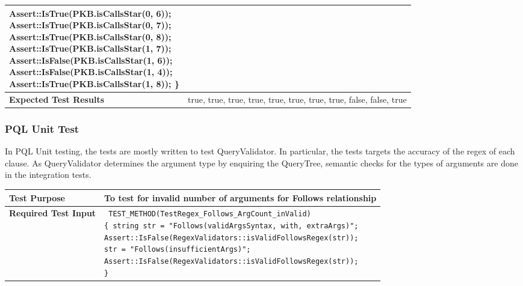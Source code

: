 \documentclass[12pt]{article}
\begin{document}
{{{{{{{{{{{{{\begin{longtable}{|L{5cm} | L{12cm}| }
{	\hspace{9mm} Assert::IsTrue(PKB.isCallsStar(0, 6)); \newline
	\hspace{9mm} Assert::IsTrue(PKB.isCallsStar(0, 7)); \newline
	\hspace{9mm} Assert::IsTrue(PKB.isCallsStar(0, 8)); \newline
	\hspace{9mm} Assert::IsTrue(PKB.isCallsStar(1, 7)); \newline
	\hspace{9mm} Assert::IsFalse(PKB.isCallsStar(1, 6)); \newline
	\hspace{9mm} Assert::IsFalse(PKB.isCallsStar(1, 4)); \newline
	\hspace{9mm} Assert::IsTrue(PKB.isCallsStar(1, 8)); \} }

 \\\hline
   \textbf{ Expected Test Results} &

true, true, true, true, true, true, true, true, false, false, true
 \\\hline
\end{longtable}

\subsubsection{PQL Unit Test}
In PQL Unit testing, the tests are mostly written to test QueryValidator. In particular, the tests targets the accuracy of the regex of each clause. As QueryValidator determines the argument type by enquiring the QueryTree, semantic checks for the types of arguments are done in the integration tests.

\begin{longtable}{|L{5cm} | L{12.5cm}| }
\hline
\textbf{Test Purpose} &
To test for invalid number of arguments for Follows relationship
\\\hline
\textbf{Required Test Input}
 &
 \texttt{
 \noindent TEST\_METHOD(TestRegex\_Follows\_ArgCount\_inValid)
\newline \vspace{2mm}
\footnotesize \{ \hspace{4mm}  string str = "Follows(validArgsSyntax, with, extraArgs)"; \newline \vspace{2mm}
 \hspace{9mm} Assert::IsFalse(RegexValidators::isValidFollowsRegex(str)); \newline 
 \hspace{9mm}   str = "Follows(insufficientArgs)";\newline 
 \hspace{9mm}  Assert::IsFalse(RegexValidators::isValidFollowsRegex(str));\newline  \} }


\end{longtable}}}}}}}}}}}}}}
\end{document}
